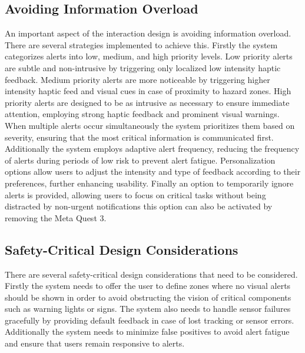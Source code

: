 \subsection{Avoiding Information Overload}
An important aspect of the interaction design is avoiding information overload. There are several strategies implemented to achieve this. Firstly the system categorizes alerts into low, medium, and high priority levels. Low priority alerts are subtle and non-intrusive by triggering only localized low intensity haptic feedback. Medium priority alerts are more noticeable by triggering higher intensity haptic feed and visual cues in case of proximity to hazard zones. High priority alerts are designed to be as intrusive as necessary to ensure immediate attention, employing strong haptic feedback and prominent visual warnings. When multiple alerts occur simultaneously the system prioritizes them based on severity, ensuring that the most critical information is communicated first.
 Additionally the system employs adaptive alert frequency, reducing the frequency of alerts during periods of low risk to prevent alert fatigue. Personalization options allow users to adjust the intensity and type of feedback according to their preferences, further enhancing usability. Finally an option to temporarily ignore alerts is provided, allowing users to focus on critical tasks without being distracted by non-urgent notifications this option can also be activated by removing the Meta Quest 3. 

\subsection{Safety-Critical Design Considerations}
There are several safety-critical design considerations that need to be considered. Firstly the system needs to offer the user to define zones where no visual alerts should be shown in order to avoid obstructing the vision of critical components such as warning lights or signs. The system also needs to handle sensor failures gracefully by providing default feedback in case of lost tracking or sensor errors. Additionally the system needs to minimize false positives to avoid alert fatigue and ensure that users remain responsive to alerts.


